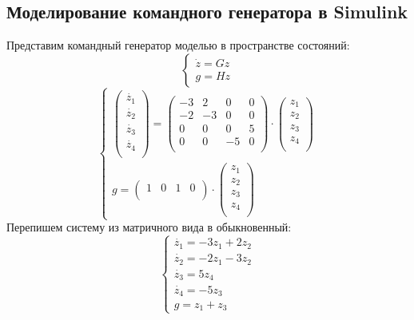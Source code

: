 \documentclass[a4paper, 12pt]{article}
\begin{document}
\subsection{Моделирование командного генератора в Simulink}
Представим командный генератор моделью в пространстве состояний:
\[
    \left\{
        \begin{aligned}
            \dot{z} = Gz \\
            g = Hz
        \end{aligned}
    \right.
\]
\[
    \left\{
        \begin{aligned}
            \begin{pmatrix}
            \dot{z_1} \\
            \dot{z_2} \\
            \dot{z_3} \\
            \dot{z_4} \\
    \end{pmatrix} = \begin{pmatrix}
        -3 & 2 & 0 & 0 \\
        -2 & -3 & 0 & 0 \\
        0 & 0 & 0 & 5 \\
        0 & 0 & -5 & 0 \\
    \end{pmatrix} \cdot \begin{pmatrix}
            z_1 \\
            z_2 \\
            z_3 \\
            z_4 \\
    \end{pmatrix} \\
        g = \begin{pmatrix}
        1 & 0 & 1 & 0 \\
    \end{pmatrix} \cdot \begin{pmatrix}
            z_1 \\
            z_2 \\
            z_3 \\
            z_4 \\
    \end{pmatrix}
        \end{aligned}
    \right.
\]
\newpage
Перепишем систему из матричного вида в обыкновенный:
\[
    \left\{
        \begin{aligned}
            \dot{z_1} = -3z_1 + 2z_2 \\
            \dot{z_2} = -2z_1 - 3z_2 \\
            \dot{z_3} = 5z_4 \\
            \dot{z_4} = -5z_3 \\
            g = z_1 + z_3
        \end{aligned}
    \right.
\]
\end{document}
